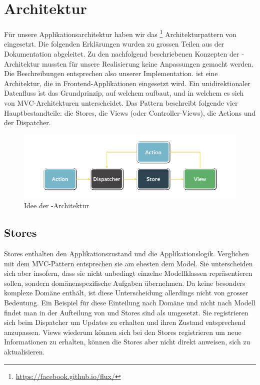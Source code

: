 \label{pd-architektur}
\section{Architektur}
Für unsere Applikationsarchitektur haben wir das \footnote{\url{https://facebook.github.io/flux/}} Architekturpattern von  eingesetzt.\newline
Die folgenden Erklärungen wurden zu grossen Teilen aus der  Dokumentation\cite{flux-docs-overview} abgeleitet.
Zu den nachfolgend beschriebenen Konzepten der -Architektur mussten für unsere Realisierung keine Anpassungen gemacht werden.
Die Beschreibungen entsprechen also unserer Implementation.\newline
{} ist eine Architektur, die in \gls{Frontend}-Applikationen eingesetzt wird.
Ein unidirektionaler Datenfluss ist das Grundprinzip, auf welchem  aufbaut, und in welchem es sich von \gls{MVC}-Architekturen unterscheidet.
Das Pattern beschreibt folgende vier Hauptbestandteile: die Stores, die Views (oder Controller-Views), die Actions und der Dispatcher.
\begin{figure}[H]
 	\centering
 	\includegraphics[width=\textwidth]{images/projektdokumentation/flux-uebersicht-weiss.png}
 	\caption{Idee der -Architektur}
 	\label{image-flux-overview-simple}
\end{figure}
\subsection{Stores}
Stores enthalten den Applikationszustand und die Applikationslogik.
Verglichen mit dem \gls{MVC}-Pattern entsprechen sie am ehesten dem Model.
Sie unterscheiden sich aber insofern, dass sie nicht unbedingt einzelne Modellklassen repräsentieren sollen, sondern domänenspezifische Aufgaben übernehmen.
Da \kort{} keine besonders komplexe Domäne enthält, ist diese Unterscheidung allerdings nicht von grosser Bedeutung.
Ein Beispiel für diese Einteilung nach Domäne und nicht nach Modell findet man in der Aufteilung von  und \newline
Stores sind als  umgesetzt.
Sie registrieren sich beim Dispatcher um Updates zu erhalten und ihren Zustand entsprechend anzupassen.
Views wiederum können sich bei den Stores registrieren um neue Informationen zu erhalten, können die Stores aber nicht direkt anweisen, sich zu aktualisieren.

